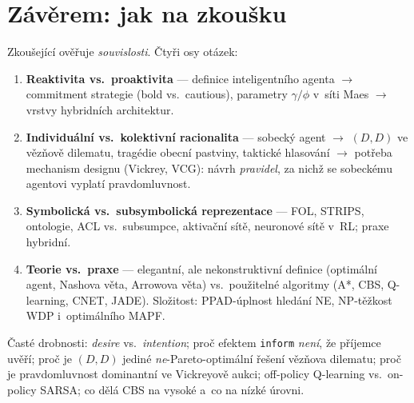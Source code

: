 \documentclass[11pt,a4paper]{article}
\theoremstyle{definition}
\begin{document}
\section*{Závěrem: jak na zkoušku}

Zkoušející ověřuje \emph{souvislosti}. Čtyři osy otázek:
\begin{enumerate}
\item \textbf{Reaktivita vs.\ proaktivita} --- definice inteligentního agenta $\to$ commitment
  strategie (bold vs.\ cautious), parametry $\gamma/\phi$ v~síti Maes $\to$ vrstvy hybridních
  architektur.
\item \textbf{Individuální vs.\ kolektivní racionalita} --- sobecký agent $\to$ $(D,D)$ ve
  vězňově dilematu, tragédie obecní pastviny, taktické hlasování $\to$ potřeba mechanism
  designu (Vickrey, VCG): návrh \emph{pravidel}, za nichž se sobeckému agentovi vyplatí
  pravdomluvnost.
\item \textbf{Symbolická vs.\ subsymbolická reprezentace} --- FOL, STRIPS, ontologie, ACL
  vs.\ subsumpce, aktivační sítě, neuronové sítě v~RL; praxe hybridní.
\item \textbf{Teorie vs.\ praxe} --- elegantní, ale nekonstruktivní definice (optimální agent,
  Nashova věta, Arrowova věta) vs.\ použitelné algoritmy (A*, CBS, Q-learning, CNET, JADE).
  Složitost: PPAD-úplnost hledání NE, NP-těžkost WDP i~optimálního MAPF.
\end{enumerate}

Časté drobnosti: \emph{desire} vs.\ \emph{intention}; proč efektem \texttt{inform}
\emph{není}, že příjemce uvěří; proč je $(D,D)$ jediné \emph{ne}-Pareto-optimální řešení
vězňova dilematu; proč je pravdomluvnost dominantní ve Vickreyově aukci; off-policy
Q-learning vs.\ on-policy SARSA; co dělá CBS na vysoké a~co na nízké úrovni.
\end{document}
